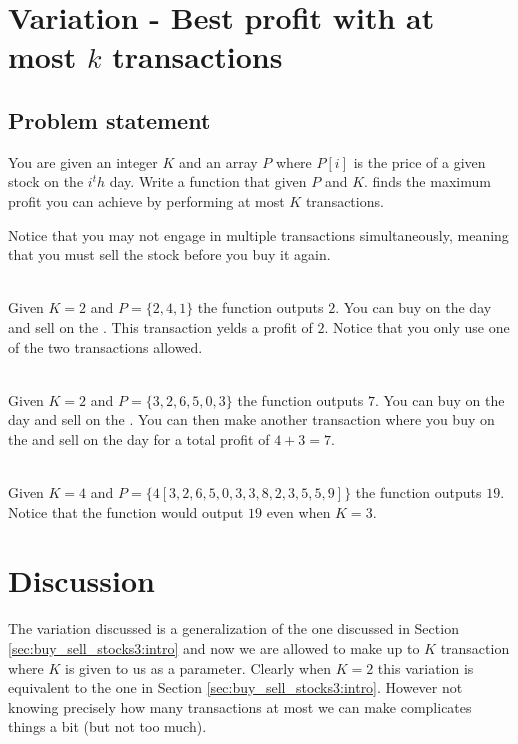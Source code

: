 \section{Variation - Best profit with at most $k$ transactions}
\label{sec:buy_sell_stocks4:intro}

\subsection{Problem statement}
\begin{exercise}
    You are given an integer $K$ and an array $P$ where $P[i]$ is the price of a given stock on the $i^th$ day.
    Write a function that given $P$ and $K$. finds the maximum profit you can achieve by performing at most $K$ transactions.
    
    Notice that you may not engage in multiple transactions simultaneously, meaning that you must sell the stock before you buy it again.
         

    \begin{example}
    \label{ex:buy_sell_stocks4:exmaple1}
        \hfill \\
        Given $K=2$ and $P=\{2,4,1\}$ the function outputs $2$. 
        You can buy on the  day and sell on the . This transaction yelds a profit of $2$. Notice that you only use one of the two transactions allowed.
    \end{example}

    \begin{example}
        \label{ex:buy_sell_stocks4:exmaple2}
            \hfill \\
            Given $K=2$ and $P=\{3,2,6,5,0,3\}$ the function outputs $7$. 
            You can buy on the  day and sell on the . You can then make another transaction where you buy on the  and sell on the  day for a total profit of $4+3=7$.
    \end{example}

    \begin{example}
        \label{ex:buy_sell_stocks4:exmaple3}
            \hfill \\
            Given $K=4$ and $P=\{4
            [3,2,6,5,0,3,3,8,2,3,5,5,9]\}$ the function outputs $19$. 
            Notice that the function would output $19$ even when $K=3$.
    \end{example}
\end{exercise}


\section{Discussion}
\label{buy_sell_stocks4:sec:discussion}
The variation discussed is a generalization of the one discussed in Section \ref{sec:buy_sell_stocks3:intro} and now we are allowed to make up to $K$ transaction where $K$ is given to us as a parameter. Clearly when $K=2$ this variation is equivalent to the one in Section \ref{sec:buy_sell_stocks3:intro}. However not knowing precisely how many transactions at most we can make complicates things a bit (but not too much).

